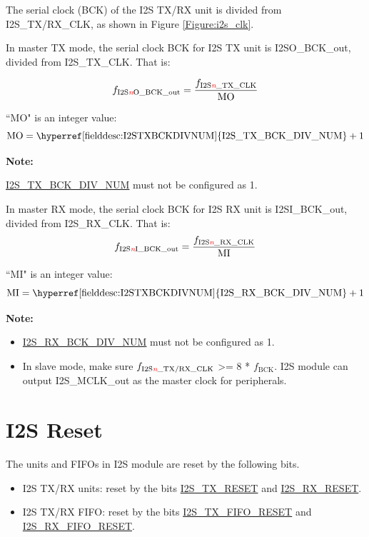\documentclass[main\_\_CN.tex]{subfiles}
\begin{document}
The serial clock (BCK) of the I2S TX/RX unit is divided from I2S\_TX/RX\_CLK, as shown in Figure \ref{Figure:i2s_clk}.

In master TX mode, the serial clock BCK for I2S TX unit is I2SO\_BCK\_out, divided from I2S\_TX\_CLK. That is:

$$f_{\textrm{I2S\textcolor{red}{\it{n}}O\_BCK\_out}} = \frac{f_{\textrm{I2S\textcolor{red}{\it{n}}\_TX\_CLK}}}{\textrm{MO}}$$


``MO" is an integer value:
$$ \textrm{MO} = \textrm{\hyperref[fielddesc:I2STXBCKDIVNUM]{I2S\_TX\_BCK\_DIV\_NUM}} + 1 $$

{\bfseries Note: }

\hyperref[fielddesc:I2STXBCKDIVNUM]{I2S\_TX\_BCK\_DIV\_NUM} must not be configured as 1.

In master RX mode, the serial clock BCK for I2S RX unit is I2SI\_BCK\_out, divided from I2S\_RX\_CLK. That is:
$$f_{\textrm{I2S\textcolor{red}{\it{n}}I\_BCK\_out}} = \frac{f_{\textrm{I2S\textcolor{red}{\it{n}}\_RX\_CLK}}}{\textrm{MI}}$$

``MI" is an integer value:
$$ \textrm{MI} = \textrm{\hyperref[fielddesc:I2STXBCKDIVNUM]{I2S\_RX\_BCK\_DIV\_NUM}} + 1 $$


{\bfseries Note: }
\begin{itemize}
    \item \hyperref[fielddesc:I2SRXBCKDIVNUM]{I2S\_RX\_BCK\_DIV\_NUM} must not be configured as 1.
    \item In slave mode, make sure $f_{\textrm{I2S\textcolor{red}{\it{n}}\_TX/RX\_CLK}}$ >= 8 * $f_{\textrm{BCK}}$. I2S module can output I2S\_MCLK\_out as the master clock for peripherals.

\end{itemize}

\section{I2S Reset} \label{i2s_module_reset}

The units and FIFOs in I2S module are reset by the following bits.
\begin{itemize}
\item I2S TX/RX units: reset by the bits  \hyperref[fielddesc:I2STXRESET]{I2S\_TX\_RESET} and  \hyperref[fielddesc:I2SRXRESET]{I2S\_RX\_RESET}.
\item I2S TX/RX FIFO: reset by the bits  \hyperref[fielddesc:I2STXFIFORESET]{I2S\_TX\_FIFO\_RESET} and  \hyperref[fielddesc:I2SRXFIFORESET]{I2S\_RX\_FIFO\_RESET}.
\end{itemize}
\end{document}
